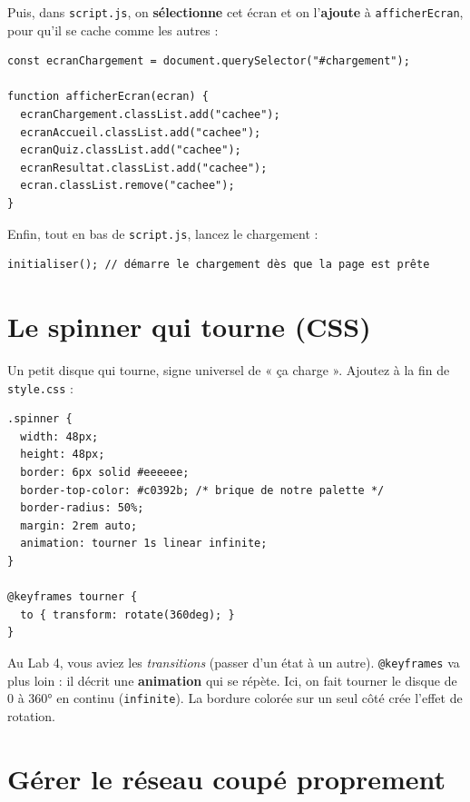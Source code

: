 \documentclass[11pt,a4paper]{article}
\newcommand{\code}[1]{\texttt{#1}}
\begin{document}
Puis, dans \code{script.js}, on \textbf{sélectionne} cet écran et on l'\textbf{ajoute} à \code{afficherEcran}, pour qu'il se cache comme les autres :

\begin{lstlisting}[style=js]
const ecranChargement = document.querySelector("#chargement");

function afficherEcran(ecran) {
  ecranChargement.classList.add("cachee");
  ecranAccueil.classList.add("cachee");
  ecranQuiz.classList.add("cachee");
  ecranResultat.classList.add("cachee");
  ecran.classList.remove("cachee");
}
\end{lstlisting}

Enfin, tout en bas de \code{script.js}, lancez le chargement :

\begin{lstlisting}[style=js]
initialiser(); // démarre le chargement dès que la page est prête
\end{lstlisting}

\section{Le spinner qui tourne (CSS)}

Un petit disque qui tourne, signe universel de « ça charge ». Ajoutez à la fin de \code{style.css} :

\begin{lstlisting}[style=html]
.spinner {
  width: 48px;
  height: 48px;
  border: 6px solid #eeeeee;
  border-top-color: #c0392b; /* brique de notre palette */
  border-radius: 50%;
  margin: 2rem auto;
  animation: tourner 1s linear infinite;
}

@keyframes tourner {
  to { transform: rotate(360deg); }
}
\end{lstlisting}

\begin{infobox}
Au Lab 4, vous aviez les \emph{transitions} (passer d'un état à un autre). \code{@keyframes} va plus loin : il décrit une \textbf{animation} qui se répète. Ici, on fait tourner le disque de 0 à 360° en continu (\code{infinite}). La bordure colorée sur un seul côté crée l'effet de rotation.
\end{infobox}

\section{Gérer le réseau coupé proprement}
\end{document}
